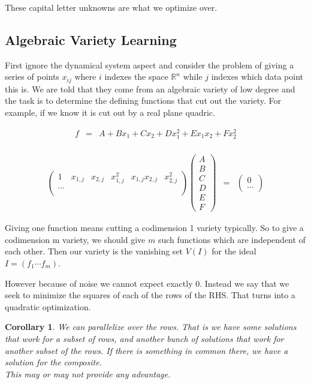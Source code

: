 \documentclass[a4paper,landscape]{article}
\theoremstyle{change}
\newtheorem{cor}[equation]{Corollary}
\theoremstyle{nonumberplain}
\numberwithin{equation}{section}
\begin{document}
These capital letter unknowns are what we optimize over.

\subsection{Algebraic Variety Learning}

First ignore the dynamical system aspect and consider the problem of giving a series of points $x_{ij}$ where $i$ indexes the space $\mathbb{R}^n$ while $j$ indexes which data point this is. We are told that they come from an algebraic variety of low degree and the task is to determine the defining functions that cut out the variety. For example, if we know it is cut out by a real plane quadric.

\begin{eqnarray*}
f &=& A + B x_1 + C x_2 + D x_1^2 + E x_1 x_2 + F x_2^2\\
\end{eqnarray*}

\begin{eqnarray*}
\begin{pmatrix}
1 & x_{1,j} & x_{2,j} & x_{1,j}^2 & x_{1,j} x_{2,j} & x_{2,j}^2\\
\cdots\\
\end{pmatrix}
\begin{pmatrix}
A\\
B\\
C\\
D\\
E\\
F
\end{pmatrix}
&=&
\begin{pmatrix}
0\\
\cdots
\end{pmatrix}
\end{eqnarray*}

Giving one function means cutting a codimension 1 variety typically. So to give a codimension m variety, we should give $m$ such functions which are independent of each other. Then our variety is the vanishing set $V(I)$ for the ideal $I = (f_1 \cdots f_m)$.

However because of noise we cannot expect exactly $0$. Instead we say that we seek to minimize the squares of each of the rows of the RHS. That turns into a quadratic optimization.

\begin{cor}
We can parallelize over the rows. That is we have some solutions that work for a subset of rows, and another bunch of solutions that work for another subset of the rows. If there is something in common there, we have a solution for the composite.\\
This may or may not provide any advantage.
\end{cor}
\end{document}
